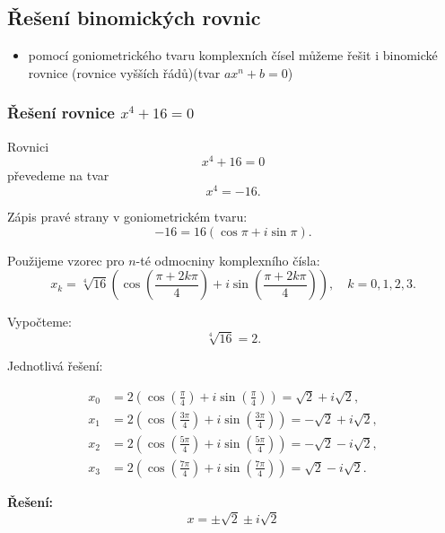 \subsection{Řešení binomických rovnic}
    \begin{itemize}
        \item pomocí goniometrického tvaru komplexních čísel můžeme řešit i binomické rovnice (rovnice vyšších řádů)(tvar $ax^n+b=0$)
    \end{itemize}
    \subsubsection{Řešení rovnice $x^4 + 16 = 0$}
        
        Rovnici
        $$
        x^4 + 16 = 0
        $$
        převedeme na tvar
        $$
        x^4 = -16.
        $$
        
        Zápis pravé strany v goniometrickém tvaru:
        $$
        -16 = 16 \left( \cos\pi + i\sin\pi \right).
        $$
        
        Použijeme vzorec pro $n$-té odmocniny komplexního čísla:
        $$
        x_k = \sqrt[4]{16} \left( \cos\left( \frac{\pi + 2k\pi}{4} \right) + i \sin\left( \frac{\pi + 2k\pi}{4} \right) \right), \quad k = 0,1,2,3.
        $$
        
        Vypočteme:
        $$
        \sqrt[4]{16} = 2.
        $$
        
        Jednotlivá řešení:
        
        \begin{align*}
        x_0 &= 2 \left( \cos\left( \frac{\pi}{4} \right) + i \sin\left( \frac{\pi}{4} \right) \right) = \sqrt{2} + i\sqrt{2}, \\
        x_1 &= 2 \left( \cos\left( \frac{3\pi}{4} \right) + i \sin\left( \frac{3\pi}{4} \right) \right) = -\sqrt{2} + i\sqrt{2}, \\
        x_2 &= 2 \left( \cos\left( \frac{5\pi}{4} \right) + i \sin\left( \frac{5\pi}{4} \right) \right) = -\sqrt{2} - i\sqrt{2}, \\
        x_3 &= 2 \left( \cos\left( \frac{7\pi}{4} \right) + i \sin\left( \frac{7\pi}{4} \right) \right) = \sqrt{2} - i\sqrt{2}.
        \end{align*}
        
        \textbf{Řešení:}
        $$
        \boxed{
        x = \pm \sqrt{2} \pm i\sqrt{2}
        }
        $$